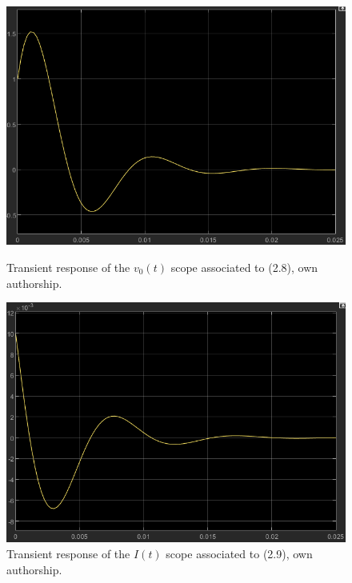 \documentclass[a4paper,12pt]{article}
\begin{document}
\begin{figure}[H]
    \centering
    \begin{minipage}[b]{0.4\linewidth}
        \centering
        \includegraphics[width=\linewidth]{fonts_lab_2/scope_v.png}
        \caption{Transient response of the $v_0(t)$ scope associated to (2.8), own authorship.}
        \label{fig:scopev}
    \end{minipage}
    \hspace{0.05\linewidth} %
    \begin{minipage}[b]{0.4\linewidth}
        \centering
        \includegraphics[width=\linewidth]{fonts_lab_2/scope_i.png}
        \caption{Transient response of the $I(t)$ scope associated to (2.9), own authorship.}
        \label{fig:scopei}
    \end{minipage}
\end{figure}
\end{document}
